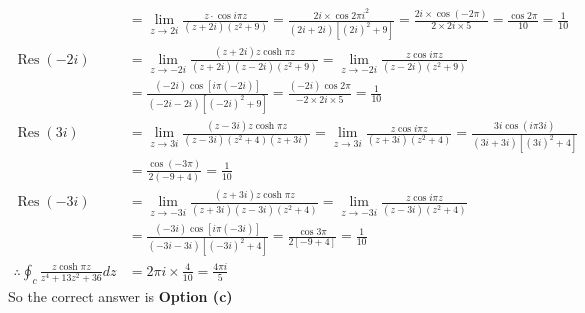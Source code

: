 \begin{enumerate}
\begin{answer}
\begin{align*}
	&=\lim _{z \rightarrow 2 i} \frac{z \cdot \cos i \pi z}{(z+2 i)\left(z^{2}+9\right)}=\frac{2 i \times \cos 2 \pi i^{2}}{(2 i+2 i)\left[(2 i)^{2}+9\right]}=\frac{2 i \times \cos (-2 \pi)}{2 \times 2 i \times 5}=\frac{\cos 2 \pi}{10}=\frac{1}{10}\\
	\operatorname{Res}(-2 i)&=\lim _{z \rightarrow-2 i} \frac{(z+2 i) z \cosh \pi z}{(z+2 i)(z-2 i)\left(z^{2}+9\right)}=\lim _{z \rightarrow-2 i} \frac{z \cos i \pi z}{(z-2 i)\left(z^{2}+9\right)}\\
	&=\frac{(-2 i) \cos [i \pi(-2 i)]}{(-2 i-2 i)\left[(-2 i)^{2}+9\right]}=\frac{(-2 i) \cos 2 \pi}{-2 \times 2 i \times 5}=\frac{1}{10}\\
	\operatorname{Res}(3 i)&=\lim _{z \rightarrow 3 i} \frac{(z-3 i) z \cosh \pi z}{(z-3 i)\left(z^{2}+4\right)(z+3 i)}=\lim _{z \rightarrow 3 i} \frac{z \cos i \pi z}{(z+3 i)\left(z^{2}+4\right)}=\frac{3 i \cos (i \pi 3 i)}{(3 i+3 i)\left[(3 i)^{2}+4\right]}\\
	&=\frac{\cos (-3 \pi)}{2(-9+4)}=\frac{1}{10}\\
	\operatorname{Res}(-3 i)&=\lim _{z \rightarrow-3 i} \frac{(z+3 i) z \cosh \pi z}{(z+3 i)(z-3 i)\left(z^{2}+4\right)}=\lim _{z \rightarrow-3 i} \frac{z \cos i \pi z}{(z-3 i)\left(z^{2}+4\right)}\\
	&=\frac{(-3 i) \cos [i \pi(-3 i)]}{(-3 i-3 i)\left[(-3 i)^{2}+4\right]}=\frac{\cos 3 \pi}{2[-9+4]}=\frac{1}{10}\\
	\therefore \oint_{c} \frac{z \cosh \pi z}{z^{4}+13 z^{2}+36} d z&=2 \pi i \times \frac{4}{10}=\frac{4 \pi i}{5}
	\end{align*}
	So the correct answer is \textbf{Option (c)}
\end{answer}	

\end{enumerate}
